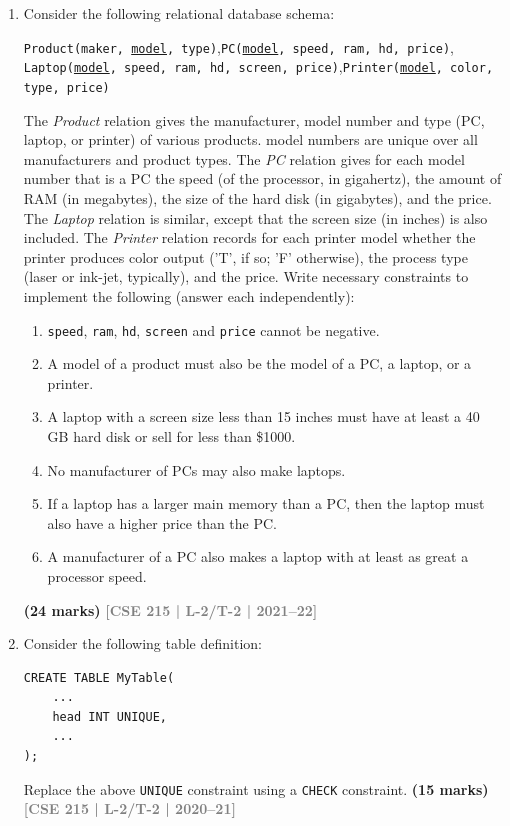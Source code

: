 \documentclass[12pt,a3paper]{article}
\newcommand{\yr}[1]{\hfill\textcolor{gray}{\small\textbf{[#1]}}}
\newcommand{\mk}[1]{\textcolor{orange!70!black}{\small\textbf{(#1 marks)}}}
\begin{document}
\begin{enumerate}
\item Consider the following relational database schema:
\begin{center}
\texttt{Product(maker, \underline{model}, type)},\quad \texttt{PC(\underline{model}, speed, ram, hd, price)},\\
\texttt{Laptop(\underline{model}, speed, ram, hd, screen, price)},\quad \texttt{Printer(\underline{model}, color, type, price)}
\end{center}
The \textit{Product} relation gives the manufacturer, model number and type (PC, laptop, or printer) of various products. model numbers are unique over all manufacturers and product types. The \textit{PC} relation gives for each model number that is a PC the speed (of the processor, in gigahertz), the amount of RAM (in megabytes), the size of the hard disk (in gigabytes), and the price. The \textit{Laptop} relation is similar, except that the screen size (in inches) is also included. The \textit{Printer} relation records for each printer model whether the printer produces color output ('T', if so; 'F' otherwise), the process type (laser or ink-jet, typically), and the price.
Write necessary constraints to implement the following (answer each independently):
\begin{enumerate}
  \item \texttt{speed}, \texttt{ram}, \texttt{hd}, \texttt{screen} and \texttt{price} cannot be negative.
  \item A model of a product must also be the model of a PC, a laptop, or a printer.
  \item A laptop with a screen size less than 15 inches must have at least a 40 GB hard disk or sell for less than \$1000.
  \item No manufacturer of PCs may also make laptops.
  \item If a laptop has a larger main memory than a PC, then the laptop must also have a higher price than the PC.
  \item A manufacturer of a PC also makes a laptop with at least as great a processor speed.
\end{enumerate}
\mk{24} \yr{CSE 215 | L-2/T-2 | 2021--22}

\item Consider the following table definition:
\begin{lstlisting}
CREATE TABLE MyTable(
    ...
    head INT UNIQUE,
    ...
);
\end{lstlisting}
Replace the above \texttt{UNIQUE} constraint using a \texttt{CHECK} constraint.
\mk{15} \yr{CSE 215 | L-2/T-2 | 2020--21}


\end{enumerate}
\end{document}
